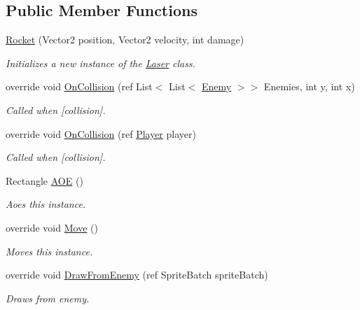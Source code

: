 \subsection*{Public Member Functions}
\begin{DoxyCompactItemize}
\item 
\hyperlink{classXaria_1_1Projectiles_1_1Rocket_ab4cd2dbf1d174525ae0d5c5b304ff725}{Rocket} (Vector2 position, Vector2 velocity, int damage)
\begin{DoxyCompactList}\small\item\em Initializes a new instance of the \hyperlink{classXaria_1_1Projectiles_1_1Laser}{Laser} class. \end{DoxyCompactList}\item 
override void \hyperlink{classXaria_1_1Projectiles_1_1Rocket_ae3a599ad8ab26ae2757e1c5948c752ac}{On\+Collision} (ref List$<$ List$<$ \hyperlink{classXaria_1_1Enemy}{Enemy} $>$$>$ Enemies, int y, int x)
\begin{DoxyCompactList}\small\item\em Called when \mbox{[}collision\mbox{]}. \end{DoxyCompactList}\item 
override void \hyperlink{classXaria_1_1Projectiles_1_1Rocket_a8d407d47417563e8ebe81e8872e1d73e}{On\+Collision} (ref \hyperlink{classXaria_1_1Player}{Player} player)
\begin{DoxyCompactList}\small\item\em Called when \mbox{[}collision\mbox{]}. \end{DoxyCompactList}\item 
Rectangle \hyperlink{classXaria_1_1Projectiles_1_1Rocket_a110540ec730017bea1cd8bf5a79b6d8d}{A\+OE} ()
\begin{DoxyCompactList}\small\item\em Aoes this instance. \end{DoxyCompactList}\item 
override void \hyperlink{classXaria_1_1Projectiles_1_1Rocket_a6f9beb147ddfbac24227ecb80fdbc71e}{Move} ()
\begin{DoxyCompactList}\small\item\em Moves this instance. \end{DoxyCompactList}\item 
override void \hyperlink{classXaria_1_1Projectiles_1_1Rocket_ab58c907729bbf1a6f0589ce8e3de469f}{Draw\+From\+Enemy} (ref Sprite\+Batch sprite\+Batch)
\begin{DoxyCompactList}\small\item\em Draws from enemy. \end{DoxyCompactList}\end{DoxyCompactItemize}
